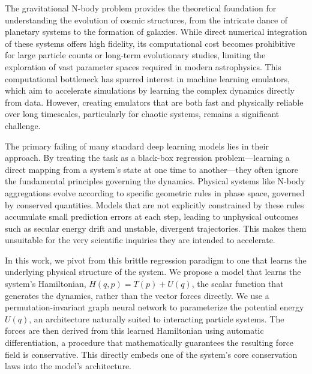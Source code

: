 \documentclass[]{article}
\begin{document}
The gravitational N-body problem provides the theoretical foundation for understanding the evolution of cosmic structures, from the intricate dance of planetary systems to the formation of galaxies. While direct numerical integration of these systems offers high fidelity, its computational cost becomes prohibitive for large particle counts or long-term evolutionary studies, limiting the exploration of vast parameter spaces required in modern astrophysics. This computational bottleneck has spurred interest in machine learning emulators, which aim to accelerate simulations by learning the complex dynamics directly from data. However, creating emulators that are both fast and physically reliable over long timescales, particularly for chaotic systems, remains a significant challenge.

The primary failing of many standard deep learning models lies in their approach. By treating the task as a black-box regression problem—learning a direct mapping from a system's state at one time to another—they often ignore the fundamental principles governing the dynamics. Physical systems like N-body aggregations evolve according to specific geometric rules in phase space, governed by conserved quantities. Models that are not explicitly constrained by these rules accumulate small prediction errors at each step, leading to unphysical outcomes such as secular energy drift and unstable, divergent trajectories. This makes them unsuitable for the very scientific inquiries they are intended to accelerate.

In this work, we pivot from this brittle regression paradigm to one that learns the underlying physical structure of the system. We propose a model that learns the system's Hamiltonian, $H(q, p) = T(p) + U(q)$, the scalar function that generates the dynamics, rather than the vector forces directly. We use a permutation-invariant graph neural network to parameterize the potential energy $U(q)$, an architecture naturally suited to interacting particle systems. The forces are then derived from this learned Hamiltonian using automatic differentiation, a procedure that mathematically guarantees the resulting force field is conservative. This directly embeds one of the system's core conservation laws into the model's architecture.
\end{document}
